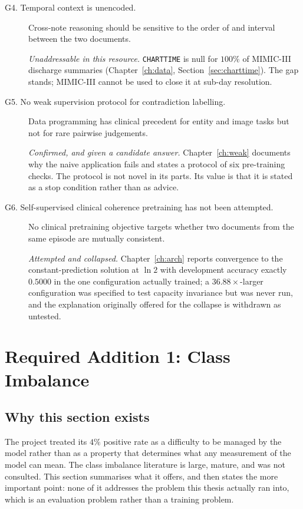 \begin{description}
\item[G4. Temporal context is unencoded.] Cross-note reasoning should be
      sensitive to the order of and interval between the two documents.

      \textit{Unaddressable in this resource.} \texttt{CHARTTIME} is null for
      $100\%$ of MIMIC-III discharge summaries (Chapter~\ref{ch:data},
      Section~\ref{sec:charttime}). The gap stands; MIMIC-III cannot be used to
      close it at sub-day resolution.

\item[G5. No weak supervision protocol for contradiction labelling.] Data
      programming has clinical precedent for entity and image tasks but not for
      rare pairwise judgements.

      \textit{Confirmed, and given a candidate answer.} Chapter~\ref{ch:weak}
      documents why the naive application fails and states a protocol of six
      pre-training checks. The protocol is not novel in its parts. Its value is
      that it is stated as a stop condition rather than as advice.

\item[G6. Self-supervised clinical coherence pretraining has not been
      attempted.] No clinical pretraining objective targets whether two
      documents from the same episode are mutually consistent.

      \textit{Attempted and collapsed.} Chapter~\ref{ch:arch} reports
      convergence to the constant-prediction solution at $\ln 2$ with
      development accuracy exactly $0.5000$ in the one configuration actually
      trained; a $36.88\times$-larger configuration was specified to test
      capacity invariance but was never run, and the explanation originally
      offered for the collapse is withdrawn as untested.
\end{description}

\section{Required Addition 1: Class Imbalance}
\label{sec:bg-imbalance}

\subsection{Why this section exists}

The project treated its $4\%$ positive rate as a difficulty to be managed by the
model rather than as a property that determines what any measurement of the
model can mean. The class imbalance literature is large, mature, and was not
consulted. This section summarises what it offers, and then states the more
important point: none of it addresses the problem this thesis actually ran into,
which is an evaluation problem rather than a training problem.


